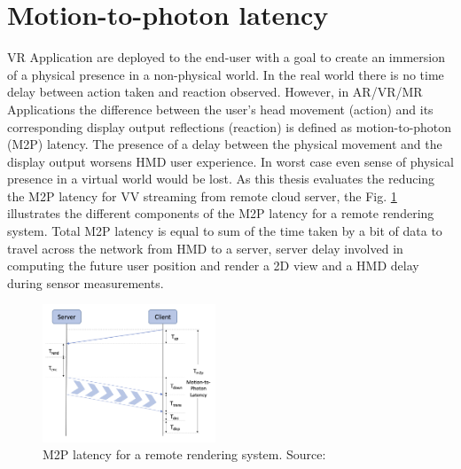 \section{Motion-to-photon latency}
\label{sec:theorie:m2p}
VR Application are deployed to the end-user with a goal to create an immersion of a physical presence in a non-physical world. In the real world there is no time delay between action taken and reaction observed. However, in AR/VR/MR Applications the difference between the user's head movement (action) and its corresponding display output reflections (reaction) is defined as motion-to-photon (M2P) latency. The presence of a delay between the physical movement and the display output worsens HMD user experience. In worst case even sense of physical presence in a virtual world would be lost. As this thesis evaluates the reducing the M2P latency for VV streaming from remote cloud server, the Fig. \ref{fig:m2p} illustrates the different components of the M2P latency for a remote rendering system. Total M2P latency is equal to sum of the time taken by a bit of data to travel across the network from HMD to a server, server delay involved in computing the future user position and render a 2D view and a HMD delay during sensor measurements.\\
\begin{figure}
	\centering
	\includegraphics[width=0.46\textwidth]{gfx/m2p.png}
	\caption{\label{fig:m2p}M2P latency for a remote rendering system. Source: \cite{serhan_cloud_streaming}}
\end{figure}

